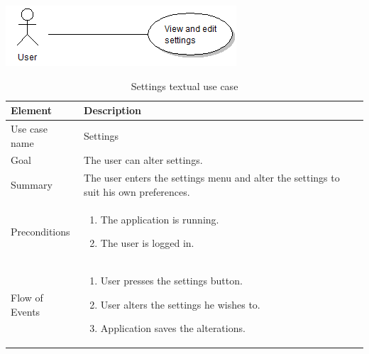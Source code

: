 \begin{table}
\begin{center}
\begin{center}
\includegraphics[width=\textwidth]{settings}
\end{center}
\begin{tabular}{p{3cm}|p{12cm}} \hline
\textbf{Element} & \textbf{Description} \\ \hline \hline
Use case name & Settings \\ 
Goal & The user can alter settings. \\ 
Summary & The user enters the settings menu and alter the settings to suit his own preferences. \\
Preconditions &
\begin{enumerate}
\item{}The application is running.
\item{}The user is logged in.
\end{enumerate} \\ \hline
Flow of Events &
\begin{enumerate}
\item{}User presses the settings button.
\item{}User alters the settings he wishes to.
\item{}Application saves the alterations.
\end{enumerate} \\ \hline
\end{tabular}
\end{center}
\caption{Settings textual use case} \label{tab:settings}
\end{table}
